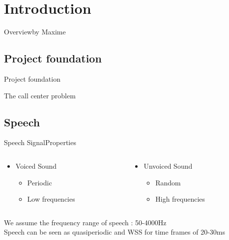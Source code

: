 \section{Introduction}
\begin{frame}{Overview}{by Maxime}
\small
{}	
\end{frame}

\subsection{Project foundation}
\begin{frame}{Project foundation}
	\begin{center}
	The call center problem 
	\end{center}
\end{frame}

\subsection{Speech}
\begin{frame}{Speech Signal}{Properties}
	\begin{center}
 	\vspace{0.5cm}
	\begin{columns}
		\begin{column}{0.5\textwidth}
		\begin{itemize}		
		\item Voiced Sound
			\begin{itemize}
				\item Periodic 
				\item Low frequencies
			\end{itemize}
		\end{itemize}
		\end{column}
		\begin{column}{0.5\textwidth} 
		\begin{itemize}
		\item Unvoiced Sound 
			\begin{itemize}
				\item Random
				\item High frequencies
			\end{itemize}	
	    \end{itemize}	
		\end{column}
	\end{columns}
	\vspace{1cm}
	We assume the frequency range of speech : 50-4000Hz \\
	Speech can be seen as quasiperiodic and WSS for time frames of 20-30ms 
	\end{center}
\end{frame}

